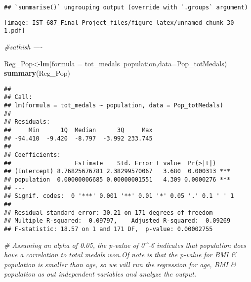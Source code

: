 \documentclass[]{article}
\newenvironment{Shaded}{\begin{snugshade}}{\end{snugshade}}
\newcommand{\CommentTok}[1]{\textcolor[rgb]{0.56,0.35,0.01}{\textit{#1}}}
\newcommand{\DataTypeTok}[1]{\textcolor[rgb]{0.13,0.29,0.53}{#1}}
\newcommand{\KeywordTok}[1]{\textcolor[rgb]{0.13,0.29,0.53}{\textbf{#1}}}
\newcommand{\NormalTok}[1]{#1}
\newcommand{\OperatorTok}[1]{\textcolor[rgb]{0.81,0.36,0.00}{\textbf{#1}}}
\begin{document}
\begin{verbatim}
## `summarise()` ungrouping output (override with `.groups` argument)
\end{verbatim}

\begin{Shaded}
\end{Shaded}

\texttt{[image: IST-687\_Final-Project\_files/figure-latex/unnamed-chunk-30-1.pdf]}

\begin{Shaded}
\begin{Highlighting}[]
\CommentTok{#sathish ----}

\NormalTok{Reg_Pop<-}\KeywordTok{lm}\NormalTok{(}\DataTypeTok{formula =}\NormalTok{ tot_medals}\OperatorTok{~}\NormalTok{population,}\DataTypeTok{data=}\NormalTok{Pop_totMedals)}
\KeywordTok{summary}\NormalTok{(Reg_Pop)}
\end{Highlighting}
\end{Shaded}

\begin{verbatim}
## 
## Call:
## lm(formula = tot_medals ~ population, data = Pop_totMedals)
## 
## Residuals:
##     Min      1Q  Median      3Q     Max 
## -94.410  -9.420  -8.797  -3.992 233.745 
## 
## Coefficients:
##                  Estimate    Std. Error t value  Pr(>|t|)    
## (Intercept) 8.76825676781 2.38299570067   3.680  0.000313 ***
## population  0.00000006685 0.00000001551   4.309 0.0000276 ***
## ---
## Signif. codes:  0 '***' 0.001 '**' 0.01 '*' 0.05 '.' 0.1 ' ' 1
## 
## Residual standard error: 30.21 on 171 degrees of freedom
## Multiple R-squared:  0.09797,    Adjusted R-squared:  0.09269 
## F-statistic: 18.57 on 1 and 171 DF,  p-value: 0.00002755
\end{verbatim}

\begin{Shaded}
\begin{Highlighting}[]
\CommentTok{#  Assuming an alpha of 0.05, the p-value of 0^-6 indicates that population does have a correlation to total medals won.Of note is that the p-value for BMI & population is smaller than age, so we will run the regression for age, BMI & population as out independent variables and analyze the output.}
\end{Highlighting}
\end{Shaded}
\end{document}
